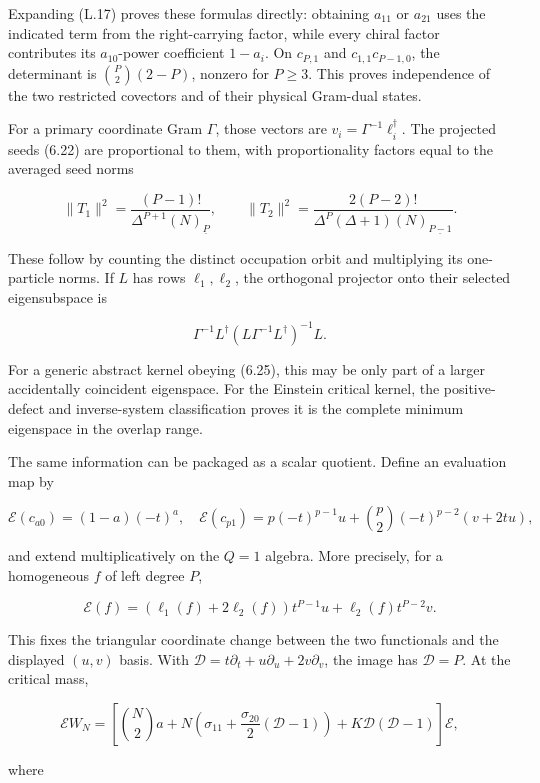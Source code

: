 \documentclass[a4paper,11pt]{article}
\numberwithin{equation}{section}
\begin{document}
Expanding (L.17) proves these formulas directly: obtaining \(a_{11}\) or \(a_{21}\) uses the indicated term from the right-carrying factor, while every chiral factor contributes its \(a_{10}\)-power coefficient \(1-a_i\). On \(c_{P,1}\) and \(c_{1,1}c_{P-1,0}\), the determinant is \(\binom P2(2-P)\), nonzero for \(P\ge3\). This proves independence of the two restricted covectors and of their physical Gram-dual states.

For a primary coordinate Gram \(\Gamma\), those vectors are \(v_i=\Gamma^{-1}\ell_i^\dagger\). The projected seeds (6.22) are proportional to them, with proportionality factors equal to the averaged seed norms

\[
\|T_1\|^2=\frac{(P-1)!}{\Delta^{P+1}(N)_{\underline P}},\qquad
\|T_2\|^2=\frac{2(P-2)!}{\Delta^P(\Delta+1)(N)_{\underline{P-1}}}.
\tag{L.20}
\]

These follow by counting the distinct occupation orbit and multiplying its one-particle norms. If \(L\) has rows \(\ell_1,\ell_2\), the orthogonal projector onto their selected eigensubspace is

\[
\Gamma^{-1}L^\dagger(L\Gamma^{-1}L^\dagger)^{-1}L.
\tag{L.21}
\]

For a generic abstract kernel obeying (6.25), this may be only part of a larger accidentally coincident eigenspace. For the Einstein critical kernel, the positive-defect and inverse-system classification proves it is the complete minimum eigenspace in the overlap range.

The same information can be packaged as a scalar quotient. Define an evaluation map by

\[
\mathcal E(c_{a0})=(1-a)(-t)^a,
\quad
\mathcal E(c_{p1})=p(-t)^{p-1}u
+\binom p2(-t)^{p-2}(v+2tu),
\tag{L.22}
\]

and extend multiplicatively on the \(Q=1\) algebra. More precisely, for a homogeneous \(f\) of left degree \(P\),

\[
\mathcal E(f)=(\ell_1(f)+2\ell_2(f))t^{P-1}u+\ell_2(f)t^{P-2}v.
\]

This fixes the triangular coordinate change between the two functionals and the displayed \((u,v)\) basis. With \(\mathcal D=t\partial_t+u\partial_u+2v\partial_v\), the image has \(\mathcal D=P\). At the critical mass,

\[
\mathcal E W_N=
\left[\binom N2 a+N\left(\sigma_{11}+\frac{\sigma_{20}}2(\mathcal D-1)\right)
+K\mathcal D(\mathcal D-1)\right]\mathcal E,
\tag{L.23}
\]

where
\end{document}
